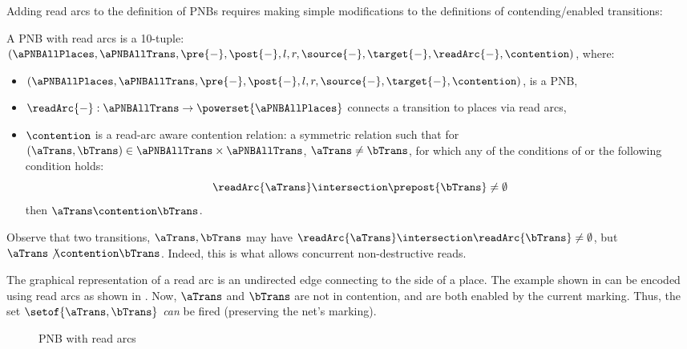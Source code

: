 Adding read arcs to the definition of PNBs requires making simple modifications
to the definitions of contending/enabled transitions:

\begin{definition}
    A PNB with read arcs is a 10-tuple:
    $(\aPNBAllPlaces, \aPNBAllTrans, \pre{-}, \post{-}, l, r, \source{-},
    \target{-}, \readArc{-}, \contention)$, where:
    \begin{itemize}
        \item $(\aPNBAllPlaces, \aPNBAllTrans, \pre{-}, \post{-}, l, r,
            \source{-}, \target{-}, \contention)$, is a PNB,
        \item $\readArc{-} : \aPNBAllTrans \to \powerset{\aPNBAllPlaces}$
            connects a transition to places via read arcs,
        \item $\contention$ is a read-arc aware contention relation: a
            symmetric relation such that for $(\aTrans, \bTrans) \in
            \aPNBAllTrans \times \aPNBAllTrans$, $\aTrans \neq \bTrans$, for
            which any of the conditions of  or
            the following condition holds:
            \[
                \readArc{\aTrans} \intersection \prepost{\bTrans} \neq \emptyset
            \]
            then $\aTrans \contention \bTrans$.
    \end{itemize}
\end{definition}

\begin{remark}
    Observe that two transitions, $\aTrans, \bTrans$ may have
    $\readArc{\aTrans} \intersection \readArc{\bTrans} \neq \emptyset$,
    but $\aTrans \not\contention \bTrans$.  Indeed, this is what allows
    concurrent non-destructive reads.
\end{remark}

The graphical representation of a read arc is an undirected edge connecting to
the side of a place.  The example shown in  can
be encoded using read arcs as shown in . Now, $\aTrans$
and $\bTrans$ are not in contention, and are both enabled by the current
marking. Thus, the set $\setof{\aTrans, \bTrans}$ \emph{can} be fired
(preserving the net's marking).

\begin{figure}[ht]
    \centering
{}
\caption{PNB with read arcs}
\label{fig:readArcs}
\end{figure}

